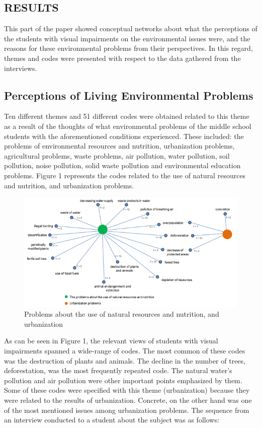 \documentclass[11.5pt]{sig-alternate} %
\begin{document}
\begin{large}
\section*{RESULTS}

This part of the paper showed conceptual networks about what the perceptions of the students with visual impairments on the environmental issues were, and the reasons for these environmental problems from their perspectives. In this regard, themes and codes were presented with respect to the data gathered from the interviews. 

\subsection*{Perceptions of Living Environmental Problems}

Ten different themes and 51 different codes were obtained related to this theme as a result of the thoughts of what environmental problems of the middle school students with the aforementioned conditions experienced. These included: the problems of environmental resources and nutrition, urbanization problems, agricultural problems, waste problems, air pollution, water pollution, soil pollution, noise pollution, solid waste pollution and environmental education problems. Figure 1 represents the codes related to the use of natural resources and nutrition, and urbanization problems. 
 
\begin{figure}[tp]
    \centering
    \includegraphics[width=1\textwidth]{Fig1.png}
    \caption{Problems about the use of natural resources and nutrition, and urbanization }
\end{figure}

As can be seen in Figure 1, the relevant views of students with visual impairments spanned a wide-range of codes. The most common of these codes was the destruction of plants and animals. The decline in the number of trees, deforestation, was the most frequently repeated code. The natural water’s pollution and air pollution were other important points emphasized by them. Some of these codes were specified with this theme (urbanization) because they were related to the results of urbanization. Concrete, on the other hand was one of the most mentioned issues among urbanization problems. The sequence from an interview conducted to a student about the subject was as follows:


\end{large}
\end{document}
